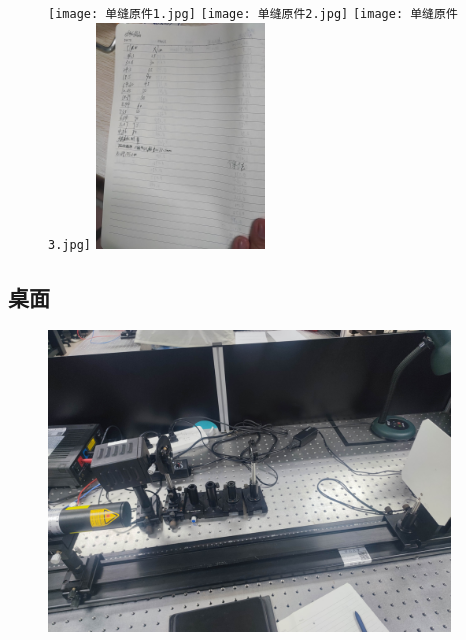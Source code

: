 \documentclass[dvipsnames, svgnames,a4paper,11pt]{article}
\begin{document}
\begin{figure}[H]
	\centering
	\texttt{[image: 单缝原件1.jpg]}
	\texttt{[image: 单缝原件2.jpg]}
	\texttt{[image: 单缝原件3.jpg]}
	\includegraphics[width=0.4\textwidth]{单缝原件4.jpg}
\end{figure}
\subsection*{桌面}
\begin{figure}[H]
	\includegraphics[width=0.95\textwidth]{单缝桌面.jpg}
\end{figure}
\end{document}
